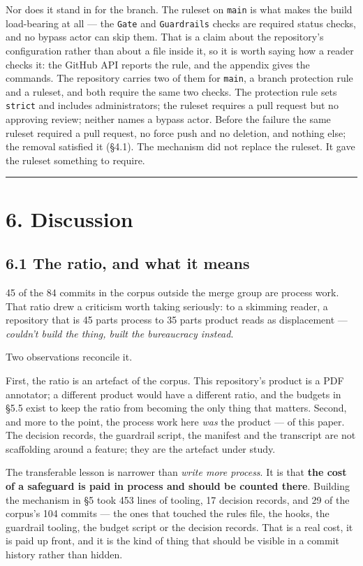 \documentclass[11pt,a4paper]{article}
\begin{document}
Nor does it stand in for the branch. The ruleset on \texttt{main} is what makes the build load-bearing at all --- the \texttt{Gate} and \texttt{Guardrails} checks are required status checks, and no bypass actor can skip them. That is a claim about the repository's configuration rather than about a file inside it, so it is worth saying how a reader checks it: the GitHub API reports the rule, and the appendix gives the commands. The repository carries two of them for \texttt{main}, a branch protection rule and a ruleset, and both require the same two checks. The protection rule sets \texttt{strict} and includes administrators; the ruleset requires a pull request but no approving review; neither names a bypass actor. Before the failure the same ruleset required a pull request, no force push and no deletion, and nothing else; the removal satisfied it (\S{}4.1). The mechanism did not replace the ruleset. It gave the ruleset something to require.

\medskip\hrule\medskip

\section*{6. Discussion}

\subsection*{6.1 The ratio, and what it means}

45 of the 84 commits in the corpus outside the merge group are process work. That ratio drew a criticism worth taking seriously: to a skimming reader, a repository that is 45 parts process to 35 parts product reads as displacement --- \emph{couldn't build the thing, built the bureaucracy instead}.

Two observations reconcile it.

First, the ratio is an artefact of the corpus. This repository's product is a PDF annotator; a different product would have a different ratio, and the budgets in \S{}5.5 exist to keep the ratio from becoming the only thing that matters. Second, and more to the point, the process work here \emph{was} the product --- of this paper. The decision records, the guardrail script, the manifest and the transcript are not scaffolding around a feature; they are the artefact under study.

The transferable lesson is narrower than \emph{write more process}. It is that \textbf{the cost of a safeguard is paid in process and should be counted there}. Building the mechanism in \S{}5 took 453 lines of tooling, 17 decision records, and 29 of the corpus's 104 commits --- the ones that touched the rules file, the hooks, the guardrail tooling, the budget script or the decision records. That is a real cost, it is paid up front, and it is the kind of thing that should be visible in a commit history rather than hidden.
\end{document}
